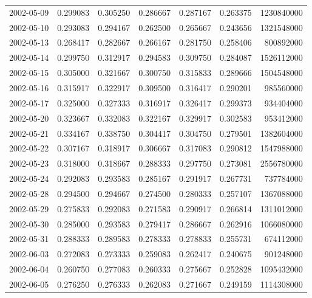 \begin{tabular}{lrrrrrr}
2002-05-09 &    0.299083 &    0.305250 &    0.286667 &    0.287167 &    0.263375 &  1230840000 \\
2002-05-10 &    0.293083 &    0.294167 &    0.262500 &    0.265667 &    0.243656 &  1321548000 \\
2002-05-13 &    0.268417 &    0.282667 &    0.266167 &    0.281750 &    0.258406 &   800892000 \\
2002-05-14 &    0.299750 &    0.312917 &    0.294583 &    0.309750 &    0.284087 &  1526112000 \\
2002-05-15 &    0.305000 &    0.321667 &    0.300750 &    0.315833 &    0.289666 &  1504548000 \\
2002-05-16 &    0.315917 &    0.322917 &    0.309500 &    0.316417 &    0.290201 &   985560000 \\
2002-05-17 &    0.325000 &    0.327333 &    0.316917 &    0.326417 &    0.299373 &   934404000 \\
2002-05-20 &    0.323667 &    0.332083 &    0.322167 &    0.329917 &    0.302583 &   953412000 \\
2002-05-21 &    0.334167 &    0.338750 &    0.304417 &    0.304750 &    0.279501 &  1382604000 \\
2002-05-22 &    0.307167 &    0.318917 &    0.306667 &    0.317083 &    0.290812 &  1547988000 \\
2002-05-23 &    0.318000 &    0.318667 &    0.288333 &    0.297750 &    0.273081 &  2556780000 \\
2002-05-24 &    0.292083 &    0.293583 &    0.285167 &    0.291917 &    0.267731 &   737784000 \\
2002-05-28 &    0.294500 &    0.294667 &    0.274500 &    0.280333 &    0.257107 &  1367088000 \\
2002-05-29 &    0.275833 &    0.292083 &    0.271583 &    0.290917 &    0.266814 &  1311012000 \\
2002-05-30 &    0.285000 &    0.293583 &    0.279417 &    0.286667 &    0.262916 &  1066080000 \\
2002-05-31 &    0.288333 &    0.289583 &    0.278333 &    0.278833 &    0.255731 &   674112000 \\
2002-06-03 &    0.272083 &    0.273333 &    0.259083 &    0.262417 &    0.240675 &   901248000 \\
2002-06-04 &    0.260750 &    0.277083 &    0.260333 &    0.275667 &    0.252828 &  1095432000 \\
2002-06-05 &    0.276250 &    0.276333 &    0.262083 &    0.271667 &    0.249159 &  1114308000 \\

\end{tabular}
